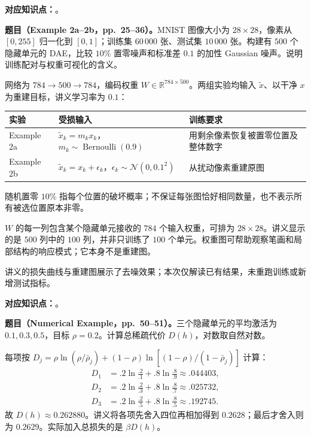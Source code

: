 
\textbf{对应知识点：}。

\textbf{题目（Example 2a--2b，pp.~25--36）。}MNIST 图像大小为 $28\times28$，像素从 $[0,255]$ 归一化到 $[0,1]$；训练集 $60\,000$ 张、测试集 $10\,000$ 张。构建有 $500$ 个隐藏单元的 DAE，比较 $10\%$ 置零噪声和标准差 $0.1$ 的加性 Gaussian 噪声。说明训练配对与权重可视化的含义。

\begin{workedsolution}
网络为 $784\to500\to784$，编码权重 $W\in\mathbb R^{784\times500}$。两组实验均输入 $\tilde x$、以干净 $x$ 为重建目标，讲义学习率为 $0.1$：
\begin{center}
\small
\begin{tabularx}{\textwidth}{@{}lXX@{}}
\toprule
实验 & 受损输入 & 训练要求 \\
\midrule
Example 2a & $\tilde x_k=m_kx_k$，$m_k\sim\operatorname{Bernoulli}(0.9)$ & 用剩余像素恢复被置零位置及整体数字 \\
Example 2b & $\tilde x_k=x_k+\epsilon_k$，$\epsilon_k\sim\mathcal N(0,0.1^2)$ & 从扰动像素重建原图 \\
\bottomrule
\end{tabularx}
\end{center}
随机置零 $10\%$ 指每个位置的破坏概率；不保证每张图恰好相同数量，也不表示所有被选位置原本非零。

$W$ 的每一列包含某个隐藏单元接收的 $784$ 个输入权重，可排为 $28\times28$。讲义显示的是 $500$ 列中的 $100$ 列，并非只训练了 $100$ 个单元。权重图可帮助观察笔画和局部结构的响应模式；它本身不是重建图。

讲义的损失曲线与重建图展示了去噪效果；本次仅解读已有结果，未重跑训练或新增测试指标。
\end{workedsolution}


\textbf{对应知识点：}。

\textbf{题目（Numerical Example，pp.~50--51）。}三个隐藏单元的平均激活为 $0.1,0.3,0.5$，目标 $\rho=0.2$。计算总稀疏代价 $D(h)$，对数取自然对数。

\begin{workedsolution}
每项按 $D_j=\rho\ln(\rho/\bar\rho_j)+(1-\rho)\ln[(1-\rho)/(1-\bar\rho_j)]$ 计算：
\[
 \begin{aligned}
 D_1&=.2\ln\frac{.2}{.1}+.8\ln\frac{.8}{.9}\approx.044403,\\
 D_2&=.2\ln\frac{.2}{.3}+.8\ln\frac{.8}{.7}\approx.025732,\\
 D_3&=.2\ln\frac{.2}{.5}+.8\ln\frac{.8}{.5}\approx.192745.
 \end{aligned}
\]
故 $D(h)\approx0.262880$。讲义将各项先舍入四位再相加得到 $0.2628$；最后才舍入则为 $0.2629$。实际加入总损失的是 $\beta D(h)$。
\end{workedsolution}

